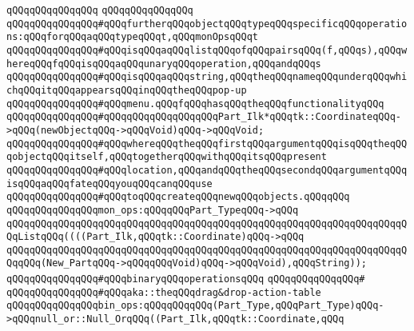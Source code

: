 \verb|qQQqqQQqqQQqqQQq|\newline
\verb|qQQqqQQqqQQqqQQq|\newline
\verb|qQQqqQQqqQQqqQQq#qQQqfurtherqQQqobjectqQQqtypeqQQqspecificqQQqoperations:qQQqforqQQqaqQQqtypeqQQqt,qQQqmonOpsqQQqt|\newline
\verb|qQQqqQQqqQQqqQQq#qQQqisqQQqaqQQqlistqQQqofqQQqpairsqQQq(f,qQQqs),qQQqwhereqQQqfqQQqisqQQqaqQQqunaryqQQqoperation,qQQqandqQQqs|\newline
\verb|qQQqqQQqqQQqqQQq#qQQqisqQQqaqQQqstring,qQQqtheqQQqnameqQQqunderqQQqwhichqQQqitqQQqappearsqQQqinqQQqtheqQQqpop-up|\newline
\verb|qQQqqQQqqQQqqQQq#qQQqmenu.qQQqfqQQqhasqQQqtheqQQqfunctionalityqQQq|\newline
\verb|qQQqqQQqqQQqqQQq#qQQqqQQqqQQqqQQqqQQqPart_Ilk*qQQqtk::CoordinateqQQq->qQQq(newObjectqQQq->qQQqVoid)qQQq->qQQqVoid;|\newline
\verb|qQQqqQQqqQQqqQQq#qQQqwhereqQQqtheqQQqfirstqQQqargumentqQQqisqQQqtheqQQqobjectqQQqitself,qQQqtogetherqQQqwithqQQqitsqQQqpresent|\newline
\verb|qQQqqQQqqQQqqQQq#qQQqlocation,qQQqandqQQqtheqQQqsecondqQQqargumentqQQqisqQQqaqQQqfateqQQqyouqQQqcanqQQquse|\newline
\verb|qQQqqQQqqQQqqQQq#qQQqtoqQQqcreateqQQqnewqQQqobjects.qQQqqQQq|\newline
\newline
\verb|qQQqqQQqqQQqqQQqmon_ops:qQQqqQQqPart_TypeqQQq->qQQq|\newline
\verb|qQQqqQQqqQQqqQQqqQQqqQQqqQQqqQQqqQQqqQQqqQQqqQQqqQQqqQQqqQQqqQQqqQQqqQQqListqQQq((((Part_Ilk,qQQqtk::Coordinate)qQQq->qQQq|\newline
\verb|qQQqqQQqqQQqqQQqqQQqqQQqqQQqqQQqqQQqqQQqqQQqqQQqqQQqqQQqqQQqqQQqqQQqqQQqqQQq(New_PartqQQq->qQQqqQQqVoid)qQQq->qQQqVoid),qQQqString));|\newline
\newline
\newline
\newline
\verb|qQQqqQQqqQQqqQQq#qQQqbinaryqQQqoperationsqQQq|\newline
\verb|qQQqqQQqqQQqqQQq#|\newline
\verb|qQQqqQQqqQQqqQQq#qQQqaka::theqQQqdrag&drop-action-table|\newline
\newline
\verb|qQQqqQQqqQQqqQQqbin_ops:qQQqqQQqqQQq(Part_Type,qQQqPart_Type)qQQq->qQQqnull_or::Null_OrqQQq((Part_Ilk,qQQqtk::Coordinate,qQQq|\newline
